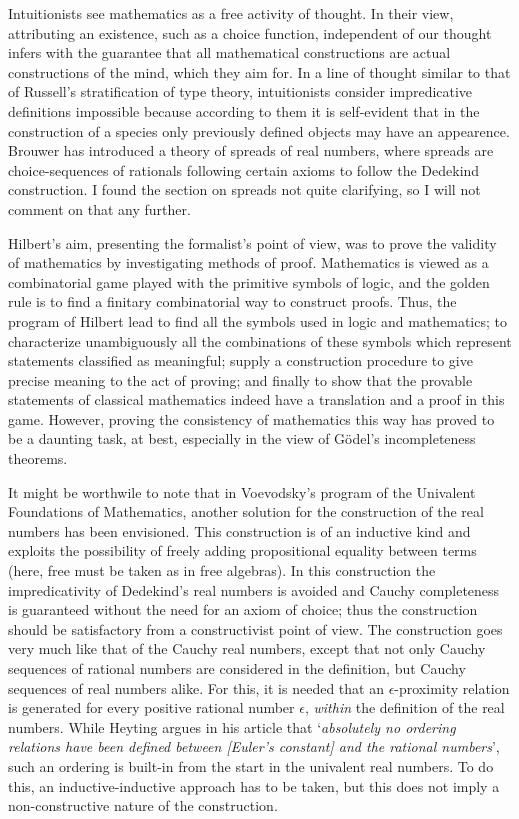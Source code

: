 \documentclass{article}
\begin{document}
Intuitionists see mathematics as a free activity of thought. In their view,
attributing an existence, such as a choice function, independent of our thought
infers with the guarantee that all mathematical constructions are actual constructions
of the mind, which they aim for. In a line of thought similar to that of Russell's
stratification of type theory, intuitionists consider impredicative definitions
impossible because according to them it is self-evident that in the construction
of a species only previously defined objects may have an appearence. Brouwer has
introduced a theory of spreads of real numbers, where spreads are choice-sequences
of rationals following certain axioms to follow the Dedekind construction. I found
the section on spreads not quite clarifying, so I will not comment on that any further.

Hilbert's aim, presenting the formalist's point of view, was to prove the validity
of mathematics by investigating methods of proof. Mathematics is viewed as a
combinatorial game played with the primitive symbols of logic, and the golden
rule is to find a finitary combinatorial way to construct proofs. Thus, the
program of Hilbert lead to find all the symbols used in logic and mathematics;
to characterize unambiguously all the combinations of these symbols which
represent statements classified as meaningful; supply a construction procedure
to give precise meaning to the act of proving; and finally to show that the
provable statements of classical mathematics indeed have a translation and a
proof in this game. However, proving the consistency of mathematics this way
has proved to be a daunting task, at best, especially in the view of G\"odel's
incompleteness theorems.

It might be worthwile to note that in Voevodsky's program of the Univalent Foundations of Mathematics, another solution for the construction of the real numbers has been envisioned. This construction is of an inductive kind and exploits the possibility of freely adding propositional equality between terms (here, free must be taken as in free algebras). In this construction the impredicativity of Dedekind's real numbers is avoided and Cauchy completeness is guaranteed without the need for an axiom of choice; thus the construction should be satisfactory from a constructivist point of view. The construction goes very much like that of the Cauchy real numbers, except that not only Cauchy sequences of rational numbers are considered in the definition, but Cauchy sequences of real numbers alike. For this, it is needed that an $\epsilon$-proximity relation is generated for every positive rational number $\epsilon$, \emph{within} the definition of the real numbers. While Heyting argues in his article that `\emph{absolutely no ordering relations have been defined between [Euler's constant] and the rational numbers}', such an ordering is built-in from the start in the univalent real numbers. To do this, an inductive-inductive approach has to be taken, but this does not imply a non-constructive nature of the construction.
\end{document}
